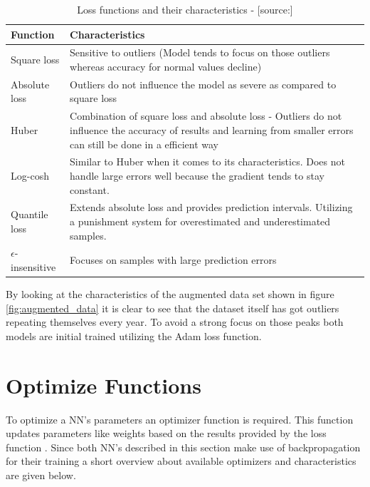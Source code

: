\begin{table}[htbp]
	\centering
		\begin{tabularx}{\textwidth}{|l|X|}
		\hline
		\rowcolor[gray]{0.9}
		Function & Characteristics \\
		\hline
		Square loss &Sensitive to outliers (Model tends to focus on those outliers whereas accuracy for normal values decline)\\
		 \hline
		Absolute loss & Outliers do not influence the model as severe as compared to square loss  \\
		Huber & Combination of square loss and absolute loss - Outliers do not influence the accuracy of results and learning from smaller errors can still be done in a efficient way  \\
		\hline
		Log-cosh & Similar to Huber when it comes to its characteristics. Does not handle large errors well because the gradient tends to stay constant. \\
		\hline
		Quantile loss & Extends absolute loss and provides prediction intervals. Utilizing a punishment system for overestimated and underestimated samples. \\
		\hline
		$\epsilon$-insensitive & Focuses on samples with large prediction errors \\
		\hline	
		\end{tabularx}
	\caption{Loss functions and their characteristics - [source:\cite{loss_func}]}
	\label{tab:loss_function}
\end{table}

By looking at the characteristics of the augmented data set shown in figure \ref{fig:augmented_data} it is clear to see that the dataset itself has got outliers repeating themselves every year. To avoid a strong focus on those peaks both models are initial trained utilizing the Adam loss function.

\section{Optimize Functions}
\label{sec:optimize_func}
To optimize a NN's parameters an optimizer function is required. This function updates parameters like weights based on the results provided by the loss function \cite{optimizer}. Since both NN's described in this section make use of backpropagation for their training a short overview about available optimizers and characteristics are given below. 

